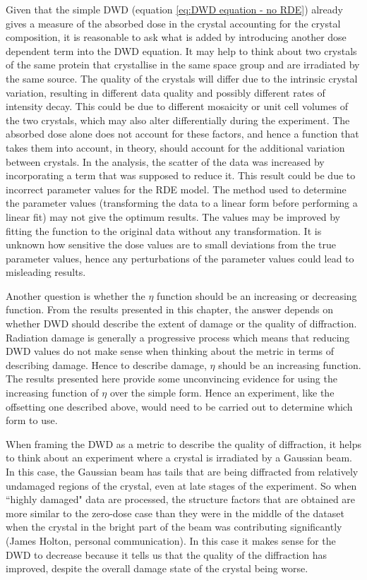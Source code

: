 Given that the simple DWD (equation \ref{eq:DWD equation - no RDE}) already gives a measure of the absorbed dose in the crystal accounting for the crystal composition, it is reasonable to ask what is added by introducing another dose dependent term into the DWD equation.
It may help to think about two crystals of the same protein that crystallise in the same space group and are irradiated by the same source.
The quality of the crystals will differ due to the intrinsic crystal variation, resulting in different data quality and possibly different rates of intensity decay.
This could be due to different mosaicity or unit cell volumes of the two crystals, which may also alter differentially during the experiment.
The absorbed dose alone does not account for these factors, and hence a function that takes them into account, in theory, should account for the additional variation between crystals.
In the analysis, the scatter of the data was increased by incorporating a term that was supposed to reduce it.
This result could be due to incorrect parameter values for the RDE model.
The method used to determine the parameter values (transforming the data to a linear form before performing a linear fit) may not give the optimum results.
The values may be improved by fitting the function to the original data without any transformation.
It is unknown how sensitive the dose values are to small deviations from the true parameter values, hence any perturbations of the parameter values could lead to misleading results.

Another question is whether the $\eta$ function should be an increasing or decreasing function.
From the results presented in this chapter, the answer depends on whether DWD should describe the extent of damage or the quality of diffraction.
Radiation damage is generally a progressive process which means that reducing DWD values do not make sense when thinking about the metric in terms of describing damage.
Hence to describe damage, $\eta$ should be an increasing function.
The results presented here provide some unconvincing evidence for using the increasing function of $\eta$ over the simple form.
Hence an experiment, like the offsetting one described above, would need to be carried out to determine which form to use.

When framing the DWD as a metric to describe the quality of diffraction, it helps to think about an experiment where a crystal is irradiated by a Gaussian beam.
In this case, the Gaussian beam has tails that are being diffracted from relatively undamaged regions of the crystal, even at late stages of the experiment.
So when ``highly damaged" data are processed, the structure factors that are obtained are more similar to the zero-dose case than they were in the middle of the dataset when the crystal in the bright part of the beam was contributing significantly (James Holton, personal communication).
In this case it makes sense for the DWD to decrease because it tells us that the quality of the diffraction has improved, despite the overall damage state of the crystal being worse.

